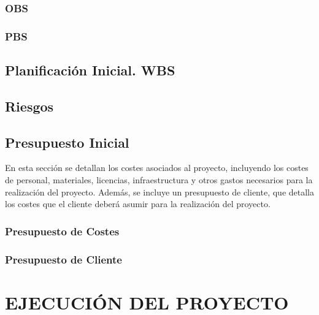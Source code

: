 \subsubsection{OBS} \label{sec:5-OBS}
\hypertarget{sec:5-OBS}{}


\subsubsection{PBS} \label{sec:5-PBS}
\hypertarget{sec:5-PBS}{}


\subsection{Planificación Inicial. WBS}




\subsection{Riesgos}





\subsection{Presupuesto Inicial}
En esta sección se detallan los costes asociados al proyecto, incluyendo los costes de personal, materiales, licencias, infraestructura y otros gastos necesarios para la realización del proyecto.
Además, se incluye un presupuesto de cliente, que detalla los costes que el cliente deberá asumir para la realización del proyecto.

\subsubsection{Presupuesto de Costes}


\subsubsection{Presupuesto de Cliente} 


\newpage
\section{EJECUCIÓN DEL PROYECTO}




